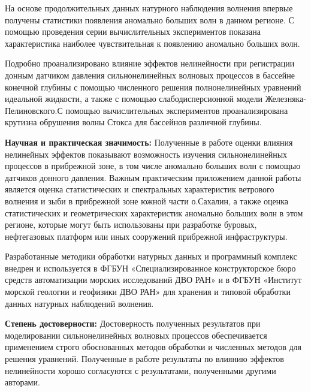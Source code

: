 На основе продолжительных данных натурного наблюдения волнения впервые получены статистики появления аномально больших волн в данном регионе. С помощью проведения серии вычислительных экспериментов показана характеристика наиболее чувствительная к появлению аномально больших волн.

Подробно проанализировано влияние эффектов нелинейности при регистрации донным датчиком давления сильнонелинейных волновых процессов в бассейне конечной глубины  с помощью численного решения полнонелинейных уравнений идеальной жидкости, а также с помощью слабодисперсионной модели Железняка-Пелиновского.С помощью вычислительных экспериментов проанализирована крутизна обрушения волны Стокса для бассейнов различной глубины.

\textbf{Научная и практическая значимость:}
Полученные в работе оценки влияния нелинейных эффектов показывают возможность изучения сильнонелинейных процессов в прибрежной зоне, в том числе аномально больших волн с помощью датчиков донного давления. Важным практическим приложением данной работы является оценка статистических и спектральных характеристик ветрового волнения и зыби в прибрежной зоне южной части о.Сахалин, а также оценка статистических и геометрических характеристик аномально больших волн в этом регионе, которые могут быть использованы при разработке буровых,  нефтегазовых платформ или иных сооружений прибрежной инфраструктуры.

Разработанные методики обработки натурных данных и программный комплекс внедрен и используется в ФГБУН «Специализированное конструкторское бюро средств автоматизации морских исследований ДВО РАН» и в ФГБУН «Институт морской геологии и геофизики ДВО РАН» для хранения и типовой обработки данных натурных наблюдений волнения.



\textbf{Степень достоверности:}
Достоверность полученных результатов при моделировании сильнонелинейных волновых процессов обеспечивается применением строго обоснованных  методов обработки и численных методов для решения уравнений. Полученные в работе результаты по влиянию эффектов нелинейности  хорошо согласуются с результатами, полученными другими авторами.

